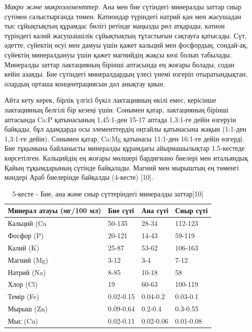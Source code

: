 \begin{multicols}{2}
\emph{Макро және микроэлементтер.} Ана мен бие сүтіндегі минералды
заттар сиыр сүтімен салыстырғанда төмен. Катиондар түріндегі натрий қан
мен жасушадан тыс сұйықтықтың құрамдас бөлігі ретінде маңызды рөл
атқарады, катион түріндегі калий жасушаішілік сұйықтықтың тұтастығын
сақтауға қатысады. Сүт, әдетте, сүйектің өсуі мен дамуы үшін қажет
кальций мен фосфордың, сондай-ақ, сүйектің минералдануы үшін қажет
магнийдің жақсы көзі болып табылады. Минералды заттар лактацияның
бірінші аптасында ең жоғары болады, содан кейін азаяды. Бие сүтіндегі
минералдардың үлесі үнемі өзгеріп отыратындықтан, олардың орташа
концентрациясын дәл анықтау қиын.

Айта кету керек, бірлік үлгісі бүкіл лактацияның өкілі емес, керісінше
лактацияның белгілі бір кезеңі үшін. Сонымен қатар, лактацияның бірінші
аптасында Ca:P қатынасының 1,45:1-ден 15-17 аптада 1,3:1-ге дейін
өзгеруін байқады, бұл адамдарда осы элементтердің оңтайлы қатынасына
жақын (1:1-ден 1,3:1-ге дейін). Сонымен қатар, Ca:Mg қатынасы 11:1-ден
16:1-ге дейін өзгерді. Бие тұқымына байланысты минералды құрамдағы
айырмашылықтар 1.5-кестеде көрсетілген. Кальцийдің ең жоғары мөлшері
бардигиано биелері мен итальяндық Қайың тұқымдарының сүтінде байқалады.
Магний мен мырыштың ең төменгі мәндері Араб биелерінде байқалды
(4-кесте) {[}10{]}.
\end{multicols}

\begin{table}[H]
\caption*{5-кесте - Бие, ана және сиыр сүттеріндегі минералды заттар{[}10{]}}
\centering
\begin{tabular}{|l|l|l|l|}
\hline
Минерал атауы (мг/100 мл) & Бие сүті & Ана сүті & Сиыр сүті \\ \hline
Кальций (Ca & 50-135 & 28-34 & 112-123 \\ \hline
Фосфор (P) & 20-121 & 14-43 & 59-119 \\ \hline
Калий (K) & 25-87 & 53-62 & 106-163 \\ \hline
Магний (Mg) & 3-12 & 3-4 & 7-12 \\ \hline
Натрий (Na) & 8-85 & 10-18 & 58 \\ \hline
Хлор (Cl) & 19 & 60-63 & 100-119 \\ \hline
Темір (Fe) & 0.02-0.15 & 0.04-0.2 & 0.03-0.1 \\ \hline
Мырыш (Zn) & 0.09-0.64 & 0.2-0.4 & 0.3-0.55 \\ \hline
Мыс (Cu) & 0.02-0.11 & 0.02-0.06 & 0.01-0.08 \\ \hline
\end{tabular}
\end{table}

